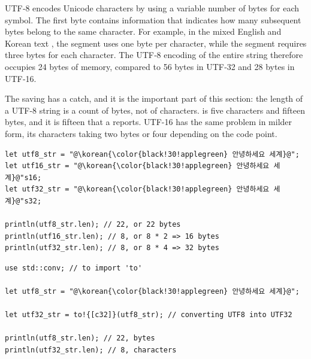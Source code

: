 UTF‑8 encodes Unicode characters by using a variable number of bytes for each
symbol. The first byte contains information that indicates how many subsequent
bytes belong to the same character. For example, in the mixed English and Korean
text \colorbox{background!90!gray!60}{}, the segment \colorbox{background!90!gray!60}{} uses one
byte per character, while the segment \colorbox{background!90!gray!60}{\korean{\color{black!30!applegreen}{"안녕하세요"}}} requires three bytes
for each character. The UTF‑8 encoding of the entire string therefore occupies
24 bytes of memory, compared to 56 bytes in UTF‑32 and 28 bytes in UTF‑16.


The saving has a catch, and it is the important part of this section: the length
of a UTF-8 string is a count of bytes, not of characters.
\colorbox{background!90!gray!60}{\korean{\color{black!30!applegreen}{"안녕하세요"}}} is
five characters and fifteen bytes, and it is fifteen that a \token{\[c8\]}
reports. UTF-16 has the same problem in milder form, its characters taking two
bytes or four depending on the code point.

\begin{lstlisting}[style=coloredverbatim, label=lst:types:encoding_example, caption=Encoding consequence on array length, escapechar=@]
let utf8_str = "@\korean{\color{black!30!applegreen} 안녕하세요 세계}@";
let utf16_str = "@\korean{\color{black!30!applegreen} 안녕하세요 세계}@"s16;
let utf32_str = "@\korean{\color{black!30!applegreen} 안녕하세요 세계}@"s32;

println(utf8_str.len); // 22, or 22 bytes
println(utf16_str.len); // 8, or 8 * 2 => 16 bytes
println(utf32_str.len); // 8, or 8 * 4 => 32 bytes
\end{lstlisting}


\begin{lstlisting}[style=coloredverbatim, label=lst:types:converting_encoding, caption=String encoding conversion, escapechar=@]
use std::conv; // to import 'to'

let utf8_str = "@\korean{\color{black!30!applegreen} 안녕하세요 세계}@";

let utf32_str = to!{[c32]}(utf8_str); // converting UTF8 into UTF32

println(utf8_str.len); // 22, bytes
println(utf32_str.len); // 8, characters
\end{lstlisting}
